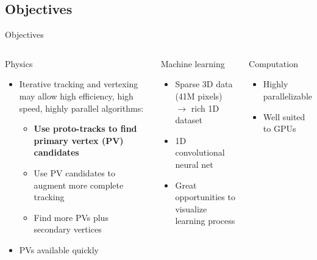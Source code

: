 \subsection{Objectives}
\begin{frame}{Objectives}
\begin{columns}[c]
    \begin{block}{Physics}
    \begin{itemize}
        \item Iterative tracking and vertexing may allow high efficiency, high speed, highly parallel algorithms:
        \begin{itemize}
            \item {\bf Use proto-tracks to find primary vertex (PV) candidates}
            \item Use PV candidates to augment more complete tracking
            \item Find more PVs plus secondary vertices
        \end{itemize}
        \item PVs available quickly
    \end{itemize}
    \end{block}
    \begin{block}{Machine learning}
    \begin{itemize}
        \item Sparse 3D data (41M pixels) $\to$ rich 1D dataset
        \item 1D convolutional neural net
        \item Great opportunities to visualize learning process
    \end{itemize}
    \end{block}

    \begin{block}{Computation}
    \begin{itemize}
        \item Highly parallelizable
        \item Well suited to GPUs
    \end{itemize}
    \end{block}
\end{columns}


\end{frame}

